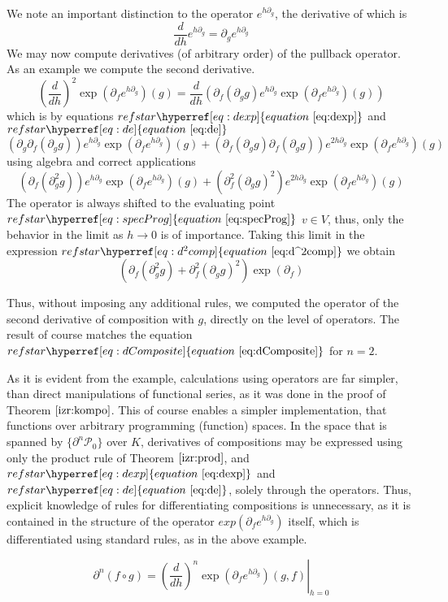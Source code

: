 \documentclass{article}
\makeatletter
\newcommand{\dP}{\mathcal{P}}
\newcommand{\D}{\partial}
\let\originaleqref\eqref %
\renewcommand{\eqref}[1]{%
  \begingroup%
  \let\ref\@refstar%
  \hyperref[#1]{%
    equation%
    ~\originaleqref{#1}%
  }%
  \endgroup
}
\makeatother
\begin{document}
 We note an important distinction to the operator $e^{h\D_g}$, the derivative of which is
 \begin{equation}\label{eq:de}
\frac{d}{dh}e^{h\D_g}=\D_ge^{h\D_g}
 \end{equation}
 We may now compute derivatives (of arbitrary order) of the pullback operator. As an example we compute the second derivative.
 $$\left(\frac{d}{dh}\right)^2\exp\left(\D_fe^{h\D_g}\right)(g)=\frac{d}{dh}\left(\D_f(\D_gg)e^{h\D_g}\exp\left(\D_fe^{h\D_g}\right)(g)\right)$$
 which is by equations $\eqref{eq:dexp}$ and $\eqref{eq:de}$
 $$(\D_g\D_f(\D_gg))e^{h\D_g}\exp(\D_fe^{h\D_g})(g)+(\D_f(\D_gg)\D_f(\D_gg))e^{2h\D_g}\exp(\D_fe^{h\D_g})(g)$$
 using algebra and correct applications
 \begin{equation}\label{eq:d^2comp}
 \left(\D_f(\D^2_gg)\right)e^{h\D_g}\exp(\D_fe^{h\D_g})(g)+(\D^2_f(\D_gg)^2)e^{2h\D_g}\exp(\D_fe^{h\D_g})(g)
 \end{equation}
 The operator is always shifted to the evaluating point $\eqref{eq:specProg}$ $v\in V$, thus, only the behavior in the limit as $h\to 0$ is of importance. Taking this limit in the expression $\eqref{eq:d^2comp}$ we obtain
 \begin{equation}
	\left(\D_f(\D^2_gg)+\D^2_f(\D_gg)^2\right)\exp(\D_f)
 \end{equation}
 
 Thus, without imposing any additional rules, we computed the operator of the second derivative of composition with $g$, directly on the level of operators. The result of course matches the equation $\eqref{eq:dComposite}$ for $n=2$.
 
 As it is evident from the example, calculations using operators are far simpler, than direct manipulations of functional series, as it was done in the proof of Theorem $\ref{izr:kompo}$. This of course enables a simpler implementation, that functions over arbitrary programming (function) spaces. In the space that is spanned by $\{\D^n\dP_0\}$ over $K$, derivatives of compositions may be expressed using only the product rule of Theorem $\ref{izr:prod}$, and $\eqref{eq:dexp}$ and $\eqref{eq:de}$, solely through the operators. Thus, explicit knowledge of rules for differentiating compositions is unnecessary, as it is contained in the structure of the operator $exp(\D_fe^{h\D_g})$ itself, which is differentiated using standard rules, as in the above example.
 
 \begin{equation}\label{eq:dkompo}
 \D^n(f\circ g)=\left.\left(\frac{d}{dh}\right)^n\exp\left(\D_fe^{h\D_g}\right)(g,f)\right|_{h=0}
 \end{equation}
 
\end{document}
